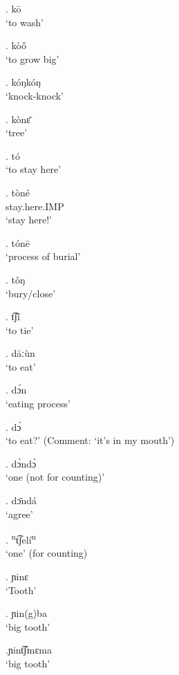 \documentclass{assets/fieldnotes}
\begin{document}

\ex. kō\\
`to wash'

\ex. kòő\\
`to grow big'

\ex. kóŋkóŋ\\
`knock-knock'

\ex. kònɛ̄\\
`tree'

\ex. tó\\
`to stay here'

\ex. tòné\\
stay.here.IMP\\
`stay here!'


\ex. tónē\\
`process of burial'

\ex. tǒŋ \\
`bury/close'

\ex. t͡ʃǐ\\
`to tie'

\ex. dāːùn\\
`to eat'

\ex. dɔ́n\\
`eating process'

\ex. dɔ́\\
`to eat?' (Comment: `it's in my mouth')

\ex. dɔ̀ndɔ̀\\
`one (not for counting)'

\ex. dɔ̄ndá\\
`agree'

\ex. \textsuperscript{n}t͡ʃelí\textsuperscript{n}\\
`one' (for counting)

\ex. ɲinɛ\\
`Tooth'

\ex. ɲin(g)ba\\
`big tooth'

\ex.ɲint͡ʃɪnɛma\\
`big tooth'

\end{document}
